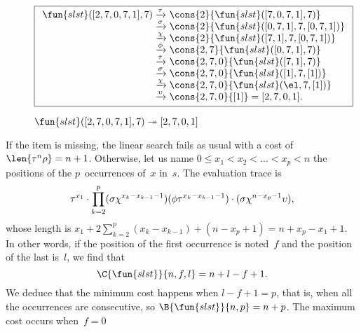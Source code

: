 \begin{figure}
\begin{equation*}
\boxed{%
\begin{array}{r@{\;}l@{\;}l}
\fun{slst}([2,7,0,7,1],7)
& \xrightarrow{\smash{\tau}}
& \cons{2}{\fun{slst}([7,0,7,1],7)}\\
& \xrightarrow{\smash{\sigma}}
& \cons{2}{\fun{slst}([0,7,1],7,[0,7,1])}\\
& \xrightarrow{\smash{\chi}}
& \cons{2}{\fun{slst}([7,1],7,[0,7,1])}\\
& \xrightarrow{\smash{\phi}}
& \cons{2,7}{\fun{slst}([0,7,1],7)}\\
& \xrightarrow{\smash{\tau}}
& \cons{2,7,0}{\fun{slst}([7,1],7)}\\
& \xrightarrow{\smash{\sigma}}
& \cons{2,7,0}{\fun{slst}([1],7,[1])}\\
& \xrightarrow{\smash{\chi}}
& \cons{2,7,0}{\fun{slst}(\el,7,[1])}\\
& \xrightarrow{\smash{\upsilon}}
& \cons{2,7,0}{[1]} = [2,7,0,1].
\end{array}}
\end{equation*}
\caption{\(\fun{slst}([2,7,0,7,1],7) \twoheadrightarrow [2,7,0,1]\)}
\label{fig:slst_27071}
\end{figure}
If the item is missing, the linear search fails as usual with a cost
of \(\len{\tau^n\rho} = n + 1\). Otherwise, let us name \( 0 \leqslant
x_1 < x_2 < \dots < x_p < n\) the positions of the \(p\)~occurrences
of~\(x\) in~\(s\). The evaluation trace is
\begin{equation*}
\abovedisplayskip=0pt
\belowdisplayskip=0pt
\tau^{x_1}
\cdot
\prod_{k=2}^{p}(\sigma\chi^{x_k-x_{k-1}-1})(\phi\tau^{x_k-x_{k-1}-1})
\cdot
(\sigma\chi^{n-x_p-1}\upsilon),
\end{equation*}
whose length is \(x_1 + 2\sum_{k=2}^{p}(x_k-x_{k-1}) + (n - x_p + 1) =
n + x_p - x_1 + 1\). In other words, if the position of the first
occurrence is noted~\(f\) and the position of the last is~\(l\), we
find that
\begin{equation*}
\C{\fun{slst}}{n,f,l} = n + l - f + 1.
\end{equation*}
We deduce that the minimum cost happens when \(l-f+1 = p\), that is, when all the occurrences
are consecutive, so \(\B{\fun{slst}}{n,p} = n +
p\). The maximum
cost occurs when~\({f=0}\)
